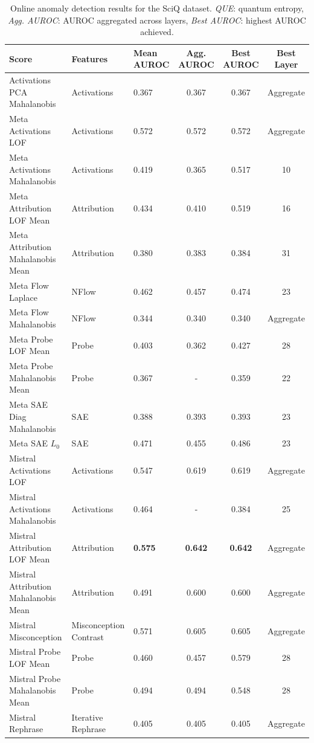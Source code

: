 \begin{table}[H]
\centering
\scriptsize  %
\renewcommand{\arraystretch}{1.2}  %
\setlength{\tabcolsep}{2pt}  %
\begin{tabular}{lp{3cm}lccc}
\toprule
\textbf{Score} & \textbf{Features} & \textbf{Mean AUROC} & \textbf{Agg. AUROC} & \textbf{Best AUROC} & \textbf{Best Layer} \\
\midrule
Activations PCA Mahalanobis          & Activations & 0.367  & 0.367  & 0.367  & Aggregate \\ 
Meta Activations LOF                 & Activations & 0.572  & 0.572  & 0.572  & Aggregate \\ 
Meta Activations Mahalanobis         & Activations & 0.419  & 0.365  & 0.517  & 10 \\ 
Meta Attribution LOF Mean            & Attribution & 0.434  & 0.410  & 0.519  & 16 \\ 
Meta Attribution Mahalanobis Mean    & Attribution & 0.380  & 0.383  & 0.384  & 31 \\ 
Meta Flow Laplace                    & NFlow      & 0.462  & 0.457  & 0.474  & 23 \\ 
Meta Flow Mahalanobis                & NFlow      & 0.344  & 0.340  & 0.340  & Aggregate \\ 
Meta Probe LOF Mean                  & Probe      & 0.403  & 0.362  & 0.427  & 28 \\ 
Meta Probe Mahalanobis Mean          & Probe      & 0.367  & -      & 0.359  & 22 \\ 
Meta SAE Diag Mahalanobis            & SAE        & 0.388  & 0.393  & 0.393  & 23 \\ 
Meta SAE $L_0$                          & SAE        & 0.471  & 0.455  & 0.486  & 23 \\ 
Mistral Activations LOF              & Activations & 0.547  & 0.619  & 0.619  & Aggregate \\ 
Mistral Activations Mahalanobis      & Activations & 0.464  & -      & 0.384  & 25 \\ 
Mistral Attribution LOF Mean         & Attribution & \textbf{0.575}  & \textbf{0.642}  & \textbf{0.642}  & Aggregate \\ 
Mistral Attribution Mahalanobis Mean & Attribution & 0.491  & 0.600  & 0.600  & Aggregate \\ 
Mistral Misconception                & Misconception Contrast & 0.571  & 0.605  & 0.605  & Aggregate \\ 
Mistral Probe LOF Mean               & Probe      & 0.460  & 0.457  & 0.579  & 28 \\ 
Mistral Probe Mahalanobis Mean       & Probe      & 0.494  & 0.494  & 0.548  & 28 \\ 
Mistral Rephrase                     & Iterative Rephrase & 0.405  & 0.405  & 0.405  & Aggregate \\ 
\bottomrule
\end{tabular}
\caption{ Online anomaly detection results for the SciQ dataset. \emph{QUE}: quantum entropy, \emph{Agg. AUROC}: AUROC aggregated across layers, \emph{Best AUROC}: highest AUROC achieved.}
\label{tab:online_anomaly_sciq}
\end{table}
